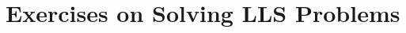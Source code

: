 \documentclass[11pt,a4paper]{article}
\begin{document}
\begin{titlepage}
    \maketitle
\end{titlepage}
\begin{center} 
    \tableofcontents  
%
\end{center}
\newpage
\part{Exercises on Solving LLS Problems}
\setcounter{section}{1}
\end{document}
